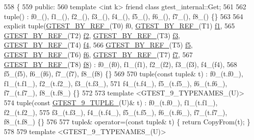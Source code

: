 \begin{DoxyCode}
558                         \{
559  \textcolor{keyword}{public}:
560   \textcolor{keyword}{template} <\textcolor{keywordtype}{int} k> \textcolor{keyword}{friend} \textcolor{keyword}{class }gtest\_internal::Get;
561 
562   tuple() : f0\_(), f1\_(), f2\_(), f3\_(), f4\_(), f5\_(), f6\_(), f7\_(), f8\_() \{\}
563 
564   \textcolor{keyword}{explicit} tuple(\hyperlink{gtest-tuple_8h_adcf9057737a411d833fac0382c13a181}{GTEST\_BY\_REF\_}(T0) f0, \hyperlink{gtest-tuple_8h_adcf9057737a411d833fac0382c13a181}{GTEST\_BY\_REF\_}(T1) 
      \hyperlink{namespacestd_1_1tr1_a9c0fa65b105f8e2f58ba59ecf75fd000}{f1},
565       \hyperlink{gtest-tuple_8h_adcf9057737a411d833fac0382c13a181}{GTEST\_BY\_REF\_}(T2) \hyperlink{namespacestd_1_1tr1_a87dd9e009868361317f587126dba63d4}{f2}, \hyperlink{gtest-tuple_8h_adcf9057737a411d833fac0382c13a181}{GTEST\_BY\_REF\_}(T3) \hyperlink{namespacestd_1_1tr1_a0f7c3b47d27d42d82d1a333ea420ce4e}{f3}, 
      \hyperlink{gtest-tuple_8h_adcf9057737a411d833fac0382c13a181}{GTEST\_BY\_REF\_}(T4) \hyperlink{namespacestd_1_1tr1_adc796e02b7385d526aff708189564f67}{f4},
566       \hyperlink{gtest-tuple_8h_adcf9057737a411d833fac0382c13a181}{GTEST\_BY\_REF\_}(T5) \hyperlink{namespacestd_1_1tr1_a9c1eb66b2b2fa321942af95405232a0d}{f5}, \hyperlink{gtest-tuple_8h_adcf9057737a411d833fac0382c13a181}{GTEST\_BY\_REF\_}(T6) \hyperlink{namespacestd_1_1tr1_a6b62f32e1e3e21bceb94eb46c4cbfd56}{f6}, 
      \hyperlink{gtest-tuple_8h_adcf9057737a411d833fac0382c13a181}{GTEST\_BY\_REF\_}(T7) \hyperlink{namespacestd_1_1tr1_a2185f3a1c07f2df072c39cb91ffa89a4}{f7},
567       \hyperlink{gtest-tuple_8h_adcf9057737a411d833fac0382c13a181}{GTEST\_BY\_REF\_}(T8) \hyperlink{namespacestd_1_1tr1_ab998afa41cea8d6d26d7e4288b0bf974}{f8}) : f0\_(f0), f1\_(f1), f2\_(f2), f3\_(f3), f4\_(f4),
568       f5\_(f5), f6\_(f6), f7\_(f7), f8\_(f8) \{\}
569 
570   tuple(\textcolor{keyword}{const} tuple& t) : f0\_(t.f0\_), f1\_(t.f1\_), f2\_(t.f2\_), f3\_(t.f3\_),
571       f4\_(t.f4\_), f5\_(t.f5\_), f6\_(t.f6\_), f7\_(t.f7\_), f8\_(t.f8\_) \{\}
572 
573   \textcolor{keyword}{template} <GTEST\_9\_TYPENAMES\_(U)>
574   tuple(\textcolor{keyword}{const} \hyperlink{gtest-tuple_8h_a1a81c17bfe3cdceb4d56b15985a44a7e}{GTEST\_9\_TUPLE\_}(U)& t) : f0\_(t.f0\_), f1\_(t.f1\_), f2\_(t.f2\_),
575       f3\_(t.f3\_), f4\_(t.f4\_), f5\_(t.f5\_), f6\_(t.f6\_), f7\_(t.f7\_), f8\_(t.f8\_) \{\}
576 
577   tuple& operator=(\textcolor{keyword}{const} tuple& t) \{ \textcolor{keywordflow}{return} CopyFrom(t); \}
578 
579   \textcolor{keyword}{template} <GTEST\_9\_TYPENAMES\_(U)>

\end{DoxyCode}
